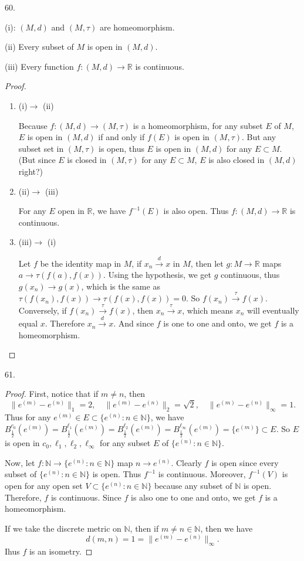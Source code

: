 \documentclass[12pt, a4paper]{article}
\theoremstyle{plain}
\newcommand{\N}{\mathbb{N}}
\newcommand{\R}{\mathbb{R}}
\begin{document}
60.

(i): $(M,d)$ and $(M,\tau)$ are homeomorphism.

(ii) Every subset of $M$ is open in $(M,d)$.

(iii) Every function $f:(M,d)\rightarrow\R$ is continuous. 
\begin{proof}
\hfill

\begin{enumerate}[label=(\roman*)]
\item (i)$\rightarrow$ (ii)

Because $f:(M,d)\rightarrow (M,\tau)$ is a homeomorphism, for any subset $E$ of $M$, $E$ is open in $(M,d)$ if and only if $f(E)$ is open in $(M,\tau)$. But any subset set in $(M,\tau)$ is open, thus $E$ is open in $(M,d)$ for any $E\subset M$. (But since $E$ is closed in $(M,\tau)$ for any $E\subset M$, $E$ is also closed in $(M,d)$ right?)

\item (ii)$\rightarrow$ (iii)

For any $E$ open in $\R$, we have $f^{-1}(E)$ is also open. Thus $f:(M,d)\rightarrow\R$ is continuous. 

\item (iii)$\rightarrow$ (i)

Let $f$ be the identity map in $M$, if $x_n\xrightarrow{d}x$ in $M$, then let $g:M\rightarrow \R$ maps $a\rightarrow \tau(f(a),f(x))$. Using the hypothesis, we get $g$ continuous, thus $g(x_n)\rightarrow g(x)$, which is the same as $\tau(f(x_n),f(x))\rightarrow \tau(f(x),f(x))=0$. So $f(x_n)\xrightarrow{\tau}f(x)$. Conversely, if $f(x_n)\xrightarrow{\tau}f(x)$, then $x_n\xrightarrow{\tau}x$, which means $x_n$ will eventually equal $x$. Therefore $x_n\xrightarrow{d}x$. And since $f$ is one to one and onto, we get $f$ is a homeomorphism.
\end{enumerate}
\end{proof}

\pagebreak

61.
\begin{proof}
First, notice that if $m\neq n$, then 
\[
\|e^{(m)}-e^{(n)}\|_1=2, \quad \|e^{(m)}-e^{(n)}\|_2=\sqrt{2},\quad \|e^{(m)}-e^{(n)}\|_\infty=1.
\]
Thus for any $e^{(m)}\in E\subset \{e^{(n)}:n\in\N\}$, we have $B_\frac{1}{2}^{c_0}(e^{(m)})=B_\frac{1}{2}^{\ell_1}(e^{(m)})=B_\frac{1}{2}^{\ell_2}(e^{(m)})=B_\frac{1}{2}^{\ell_\infty}(e^{(m)})=\{e^{(m)}\}\subset E$. So $E$ is open in $c_0,\ell_1,\ell_2,\ell_\infty$ for any subset $E$ of $\{e^{(n)}:n\in\N\}$.

Now, let $f:\N\rightarrow \{e^{(n)}:n\in\N\}$ map $n\rightarrow e^{(n)}$. Clearly $f$ is open since every subset of $\{e^{(n)}:n\in\N\}$ is open. Thus $f^{-1}$ is continuous. Moreover, $f^{-1}(V)$ is open for any open set $V\subset \{e^{(n)}:n\in\N\}$ because any subset of $\N$ is open. Therefore, $f$ is continuous. Since $f$ is also one to one and onto, we get $f$ is a homeomorphism. 

If we take the discrete metric on $\N$, then if $m\neq n\in\N$, then we have
\[
d(m,n) = 1 = \|e^{(m)}-e^{(n)}\|_\infty.
\]
Ihus $f$ is an isometry.
\end{proof}
\end{document}
